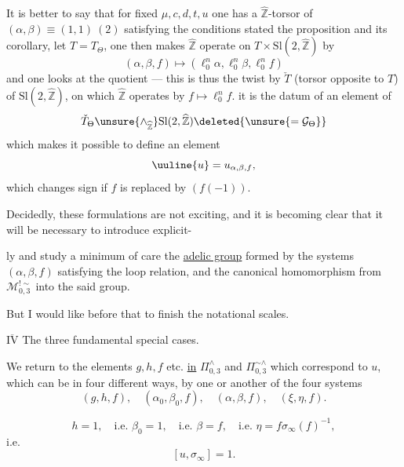 It is better to say that for fixed $\mu,c,d,t,u$ one has a $\widehat{\mathbb Z}$-torsor of $(\alpha,\beta)\equiv(1,1)\ (2)$ satisfying the conditions stated  the proposition  and its corollary, let $T=T_\Theta$, one then makes $\widehat{\mathbb Z}$ operate  on $T\times\mathrm{Sl}(2,\widehat{\mathbb Z})$ by
\[
 (\alpha,\beta,f)\longmapsto
 (\ell_0^n\alpha,\ell_0^n\beta,\ell_0^n f)
\]
and one looks at the quotient --- this is thus the twist by $\check T$ (torsor opposite to $T$) of $\mathrm{Sl}(2,\widehat{\mathbb Z})$, on which $\widehat{\mathbb Z}$ operates by $f\longmapsto\ell_0^n f$.  it is the datum of an element  of
\[
 \check T_\Theta\unsure{\mathbin{\wedge}_{\widehat{\mathbb Z}}}\mathrm{Sl}(2,\widehat{\mathbb Z})
 \deleted{\unsure{=\mathcal G_\Theta}}
\]
which makes it possible to define an element
\[
 \uuline{u}=u_{\alpha,\beta,f},
\]
which changes sign if $f$ is replaced by $(f(-1))$.

Decidedly, these formulations are not exciting, and it is becoming clear that it will be necessary to introduce explicit-


ly and study  a minimum of care the \uline{adelic group} formed by the systems $(\alpha,\beta,f)$ satisfying the loop relation, and  the canonical homomorphism from $\mathcal M_{0,3}^{!\sim}$ into the said group.

But I would like before that to finish the notational scales.



\uline{$\overline{\mathrm{IV}}$} The three fundamental special cases.

We return to the elements $g,h,f$ etc. \uline{in} $\Pi_{0,3}^{\wedge}$ and $\Pi_{0,3}^{\sim\wedge}$ which correspond to $u$, which can be  in four different ways, by one or another of the four systems
\[
\tag{92}
 (g,h,f),\quad(\alpha_0,\beta_0,f),\quad(\alpha,\beta,f),\quad(\xi,\eta,f).
\]

\[
\tag{93}
 h=1,\quad\text{i.e. }\beta_0=1,\quad\text{i.e. }\beta=f,\quad
 \text{i.e. }\eta=f\sigma_\infty(f)^{-1},
\]
i.e.
\[
\tag{94}
 [u,\sigma_\infty]=1.
\]

